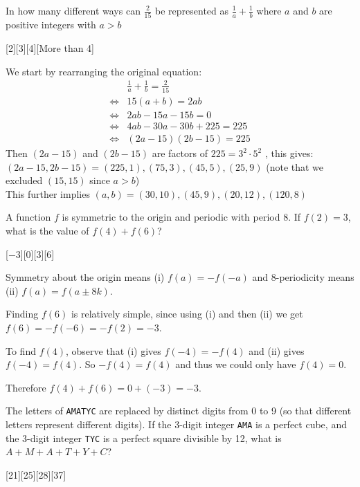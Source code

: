 \begin{problem}[C][3][AMATYC April 2002/6]
    In how many different ways can $\frac{2}{15}$ be represented as $\frac{1}{a}+\frac{1}{b}$ where $a$ and $b$ are positive integers with $a>b$
\end{problem}
[2][3][4][More than 4]

\begin{solution}[D]
    We start by rearranging the original equation:
    \begin{align*}
        &\frac{1}{a}+\frac{1}{b}=\frac{2}{15}\\
        \iff &15(a+b)=2ab\\
        \iff &2ab-15a-15b=0\\
        \iff &4ab-30a-30b+225=225\\
        \iff &(2a-15)(2b-15)=225
    \end{align*}
    Then $(2a-15)$ and $(2b-15)$ are factors of $225=3^2 \cdot5^2$ , this gives:\\
    $(2a-15,2b-15) = (225,1),(75,3),(45,5),(25,9)$ (note that we excluded $(15,15)$ since $a>b$)\\
    This further implies $(a,b) = (30,10),(45,9),(20,12),(120,8)$
\end{solution}

\begin{problem}
    A function $f$ is symmetric to the origin and periodic with period 8. If $f(2) = 3$, what is the value of $f(4) + f(6)$?
\end{problem}
[$-3$][$0$][$3$][$6$]

\begin{solution}[B]
    Symmetry about the origin means (i) $f(a)=-f(-a)$ and 8-periodicity means (ii) $f(a)=f(a\pm8k)$. 

    Finding $f(6)$ is relatively simple, since using (i) and then (ii) we get $f(6) = -f(-6) = -f(2) = -3$.

    To find $f(4)$, observe that (i) gives $f(-4) = -f(4)$ and (ii) gives $f(-4) = f(4)$. So $-f(4)=f(4)$ and thus we could only have $f(4)=0$.

    Therefore $f(4) + f(6) = 0 + (-3) = \boxed{-3}$.
\end{solution}

\begin{problem}
    The letters of \texttt{AMATYC} are replaced by distinct digits from 0 to 9 (so that different letters represent different digits). If the 3-digit integer \texttt{AMA} is a perfect cube, and the 3-digit integer \texttt{TYC} is a perfect square divisible by 12, what is \( A + M + A + T + Y + C \)?
\end{problem}
[21][25][28][37]

